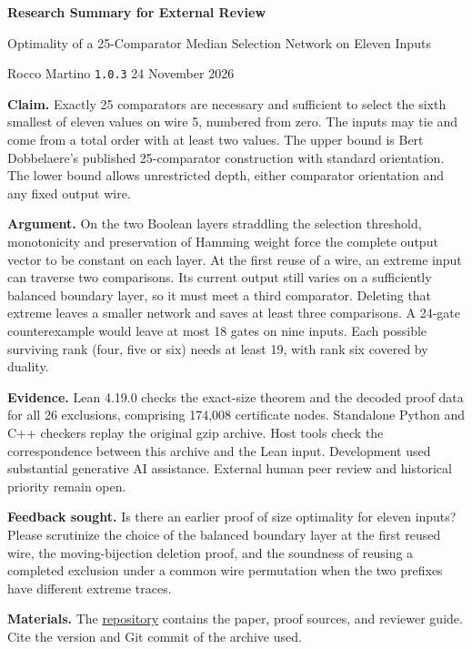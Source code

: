 \documentclass[11pt]{article}
\begin{document}
{\LARGE\bfseries Research Summary for External Review\par}
{\large Optimality of a 25-Comparator Median Selection Network on Eleven Inputs\par}
Rocco Martino \hfill \texttt{1.0.3} \hfill 24 November 2026

\textbf{Claim.} Exactly 25 comparators are necessary and sufficient to select the sixth smallest of eleven values on wire 5, numbered from zero. The inputs may tie and come from a total order with at least two values. The upper bound is Bert Dobbelaere's published 25-comparator construction with standard orientation. The lower bound allows unrestricted depth, either comparator orientation and any fixed output wire.

\textbf{Argument.} On the two Boolean layers straddling the selection threshold, monotonicity and preservation of Hamming weight force the complete output vector to be constant on each layer. At the first reuse of a wire, an extreme input can traverse two comparisons. Its current output still varies on a sufficiently balanced boundary layer, so it must meet a third comparator. Deleting that extreme leaves a smaller network and saves at least three comparisons. A 24-gate counterexample would leave at most 18 gates on nine inputs. Each possible surviving rank (four, five or six) needs at least 19, with rank six covered by duality.

\textbf{Evidence.} Lean 4.19.0 checks the exact-size theorem and the decoded proof data for all 26 exclusions, comprising 174,008 certificate nodes. Standalone Python and C++ checkers replay the original gzip archive. Host tools check the correspondence between this archive and the Lean input. Development used substantial generative AI assistance. External human peer review and historical priority remain open.

\textbf{Feedback sought.} Is there an earlier proof of size optimality for eleven inputs? Please scrutinize the choice of the balanced boundary layer at the first reused wire, the moving-bijection deletion proof, and the soundness of reusing a completed exclusion under a common wire permutation when the two prefixes have different extreme traces.

\textbf{Materials.} The \href{https://github.com/HaxelThePenguine/median-of-11}{repository} contains the paper, proof sources, and reviewer guide. Cite the version and Git commit of the archive used.
\end{document}
